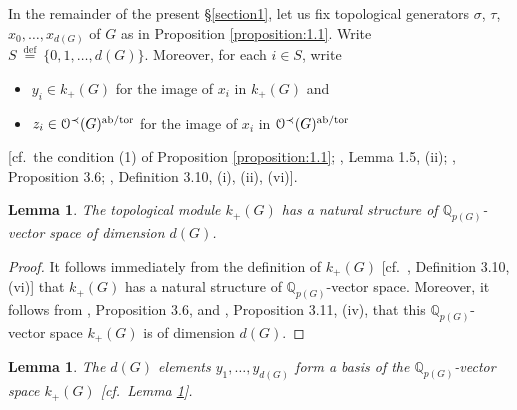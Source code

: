 \documentclass[12pt,showkeys]{amsart}
\theoremstyle{theorem}
\newtheorem{lem}[theorem]{Lemma}
\theoremstyle{definition}
\def\bQ{{\mathbb Q}}
\def\CalO{{\mathcal O}}
\def\defeq{ \ {\stackrel{\mathrm{def}}{=}} \ }
\begin{document}
In the remainder of the present \S \ref{section1}, let us fix 
topological generators $\sigma$, $\tau$, $x_0, \dots, x_{d(G)}$ of 
$G$ as in Proposition \ref{proposition:1.1}. Write $S \defeq \{0, 
1, \dots, d(G)\}$. 
Moreover, for each $i \in S$, write 
\begin{itemize}
\item
$y_i \in k_+(G)$ for the image of $x_i$ in $k_+(G)$ 
and 
\item
$z_i \in \CalO^{\prec}(G)^{\rm ab/tor}$ for the image 
of $x_i$ in $\CalO^{\prec}(G)^{\rm ab/tor}$ 
\end{itemize}
[cf.\ the condition (1) of Proposition \ref{proposition:1.1}; 
\cite{Hoshi1}, Lemma 1.5, (ii); \cite{Hoshi1}, Proposition 3.6; 
\cite{Hoshi1}, Definition 3.10, (i), (ii), (vi)]. 

\begin{lem}\label{lemma:1.2} 
 The topological module $k_{+}(G)$ has a natural structure of ${\bQ}_{p(G)}$-vector space of dimension $d(G)$. 
\end{lem}

\begin{proof}
It follows immediately from the definition of $k_{+}(G)$ [cf.\ \cite{Hoshi1}, Definition 3.10, (vi)] that $k_{+}(G)$ has a natural structure of ${\bQ}_{p(G)}$-vector space. Moreover, it follows from \cite{Hoshi1}, Proposition 3.6, and  \cite{Hoshi1}, Proposition 3.11, (iv), that this $\bQ_{p(G)}$-vector space $k_{+}(G)$ is of dimension $d(G)$. 
\end{proof}

\begin{lem}\label{lemma:1.3} 
The $d(G)$ elements $y_1, \dots, y_{d(G)}$ form a basis of the $\bQ_{p(G)}$-vector space $k_{+}(G)$ [cf.\ Lemma \ref{lemma:1.2}]. 
\end{lem}
\end{document}
